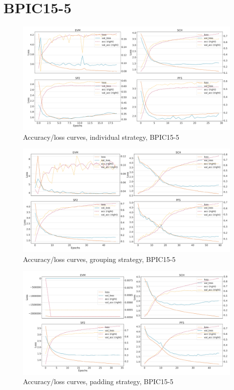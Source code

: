 \section*{BPIC15-5}
\begin{figure}[!htb]
    \centering
    \includegraphics[width=\textwidth]{gfx/bpic2015_5/individual_loss_acc_curve.pdf}
    \caption{Accuracy/loss curves, individual strategy, BPIC15-5}
\end{figure}
\begin{figure}[!htb]
    \centering
    \includegraphics[width=\textwidth]{gfx/bpic2015_5/grouped_loss_acc_curve.pdf}
    \caption{Accuracy/loss curves, grouping strategy, BPIC15-5}
\end{figure}
\begin{figure}[!htb]
    \centering
    \includegraphics[width=\textwidth]{gfx/bpic2015_5/padded_loss_acc_curve.pdf}
    \caption{Accuracy/loss curves, padding strategy, BPIC15-5}
\end{figure}
